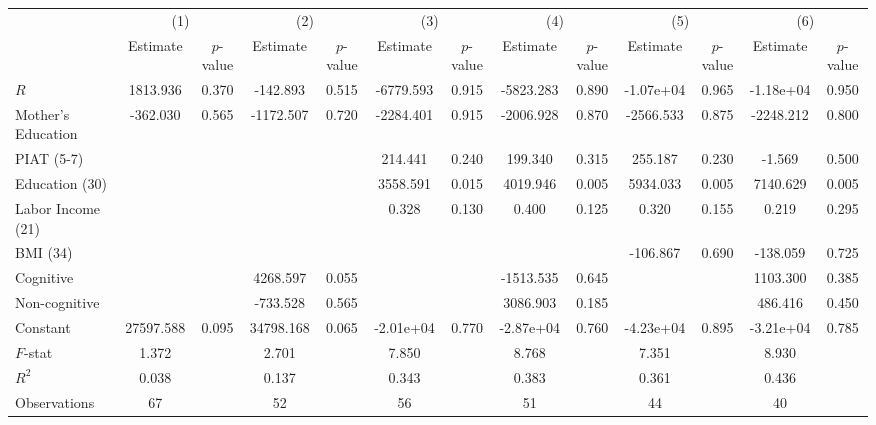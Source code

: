 
\begin{tabular}{lcccccccccccc} \toprule
 & \multicolumn{2}{c}{(1)}  &  \multicolumn{2}{c}{(2)}  &  \multicolumn{2}{c}{(3)}  &  \multicolumn{2}{c}{(4)}  & \multicolumn{2}{c}{(5)} & \multicolumn{2}{c}{(6)} \\  
 & Estimate & $p$-value & Estimate & $p$-value & Estimate & $p$-value & Estimate & $p$-value & Estimate & $p$-value & Estimate & $p$-value \\ \midrule
$R$ &  1813.936 &     0.370 &  -142.893 &     0.515 & -6779.593 &     0.915 & -5823.283 &     0.890 & -1.07e+04 &     0.965 & -1.18e+04 &     0.950 \\  
Mother's Education &  -362.030 &     0.565 & -1172.507 &     0.720 & -2284.401 &     0.915 & -2006.928 &     0.870 & -2566.533 &     0.875 & -2248.212 &     0.800 \\  
PIAT (5-7) &         &         &         &         &   214.441 &     0.240 &   199.340 &     0.315 &   255.187 &     0.230 &    -1.569 &     0.500 \\  
Education (30) &         &         &         &         &  3558.591 &     0.015 &  4019.946 &     0.005 &  5934.033 &     0.005 &  7140.629 &     0.005 \\  
Labor Income (21) &         &         &         &         &     0.328 &     0.130 &     0.400 &     0.125 &     0.320 &     0.155 &     0.219 &     0.295 \\  
BMI (34) &         &         &         &         &         &         &         &         &  -106.867 &     0.690 &  -138.059 &     0.725 \\  
Cognitive &         &         &  4268.597 &     0.055 &         &         & -1513.535 &     0.645 &         &         &  1103.300 &     0.385 \\  
Non-cognitive &         &         &  -733.528 &     0.565 &         &         &  3086.903 &     0.185 &         &         &   486.416 &     0.450 \\  
Constant & 27597.588 &     0.095 & 34798.168 &     0.065 & -2.01e+04 &     0.770 & -2.87e+04 &     0.760 & -4.23e+04 &     0.895 & -3.21e+04 &     0.785 \\  \midrule
$F$-stat &     1.372 &         &     2.701 &         &     7.850 &         &     8.768 &         &     7.351 &         &     8.930 &         \\  
$R^2$ &     0.038 &         &     0.137 &         &     0.343 &         &     0.383 &         &     0.361 &         &     0.436 &         \\  
Observations &    67 &         &    52 &         &    56 &         &    51 &         &    44 &         &    40 &         \\  
\bottomrule \end{tabular}

